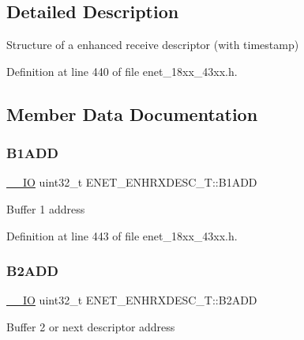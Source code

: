 \subsection{Detailed Description}
Structure of a enhanced receive descriptor (with timestamp) 

Definition at line 440 of file enet\+\_\+18xx\+\_\+43xx.\+h.



\subsection{Member Data Documentation}
\mbox{\label{struct_e_n_e_t___e_n_h_r_x_d_e_s_c___t_afc652bb16c0e010ce7fff8a82ccff998}} 
\subsubsection{\texorpdfstring{B1\+A\+DD}{B1ADD}}
{\footnotesize\ttfamily \hyperlink{core__sc300_8h_aec43007d9998a0a0e01faede4133d6be}{\+\_\+\+\_\+\+IO} uint32\+\_\+t E\+N\+E\+T\+\_\+\+E\+N\+H\+R\+X\+D\+E\+S\+C\+\_\+\+T\+::\+B1\+A\+DD}

Buffer 1 address 

Definition at line 443 of file enet\+\_\+18xx\+\_\+43xx.\+h.

\mbox{\label{struct_e_n_e_t___e_n_h_r_x_d_e_s_c___t_ad81ba09740498609241b01fcbdd854fe}} 
\subsubsection{\texorpdfstring{B2\+A\+DD}{B2ADD}}
{\footnotesize\ttfamily \hyperlink{core__sc300_8h_aec43007d9998a0a0e01faede4133d6be}{\+\_\+\+\_\+\+IO} uint32\+\_\+t E\+N\+E\+T\+\_\+\+E\+N\+H\+R\+X\+D\+E\+S\+C\+\_\+\+T\+::\+B2\+A\+DD}

Buffer 2 or next descriptor address 


